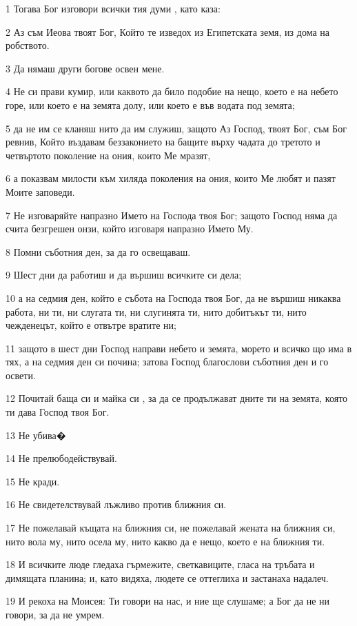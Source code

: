 \par 1 Тогава Бог изговори всички тия думи , като каза:
\par 2 Аз съм Иеова твоят Бог, Който те изведох из Египетската земя, из дома на робството.
\par 3 Да нямаш други богове освен мене.
\par 4 Не си прави кумир, или каквото да било подобие на нещо, което е на небето горе, или което е на земята долу, или което е във водата под земята;
\par 5 да не им се кланяш нито да им служиш, защото Аз Господ, твоят Бог, съм Бог ревнив, Който въздавам беззаконието на бащите върху чадата до третото и четвъртото поколение на ония, които Ме мразят,
\par 6 а показвам милости към хиляда поколения на ония, които Ме любят и пазят Моите заповеди.
\par 7 Не изговаряйте напразно Името на Господа твоя Бог; защото Господ няма да счита безгрешен онзи, който изговаря напразно Името Му.
\par 8 Помни съботния ден, за да го освещаваш.
\par 9 Шест дни да работиш и да вършиш всичките си дела;
\par 10 а на седмия ден, който е събота на Господа твоя Бог, да не вършиш никаква работа, ни ти, ни слугата ти, ни слугинята ти, нито добитъкът ти, нито чежденецът, който е отвътре вратите ни;
\par 11 защото в шест дни Господ направи небето и земята, морето и всичко що има в тях, а на седмия ден си почина; затова Господ благослови съботния ден и го освети.
\par 12 Почитай баща си и майка си , за да се продължават дните ти на земята, която ти дава Господ твоя Бог.
\par 13 Не убива�
\par 14 Не прелюбодействувай.
\par 15 Не кради.
\par 16 Не свидетелствувай лъжливо против ближния си.
\par 17 Не пожелавай къщата на ближния си, не пожелавай жената на ближния си, нито вола му, нито осела му, нито какво да е нещо, което е на ближния ти.
\par 18 И всичките люде гледаха гърмежите, светкавиците, гласа на тръбата и димящата планина; и, като видяха, людете се оттеглиха и застанаха надалеч.
\par 19 И рекоха на Моисея: Ти говори на нас, и ние ще слушаме; а Бог да не ни говори, за да не умрем.
